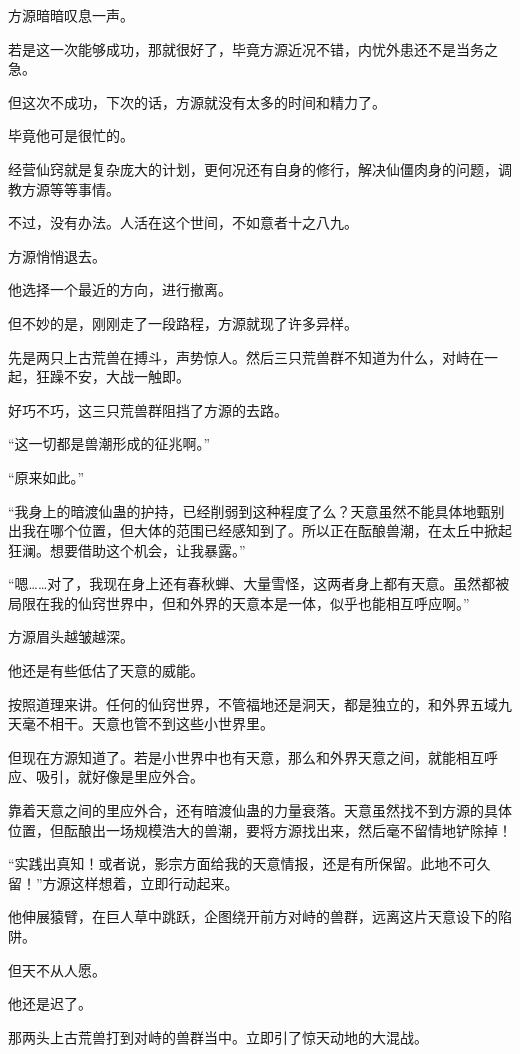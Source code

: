 \begin{this_body}
方源暗暗叹息一声。

若是这一次能够成功，那就很好了，毕竟方源近况不错，内忧外患还不是当务之急。

但这次不成功，下次的话，方源就没有太多的时间和精力了。

毕竟他可是很忙的。

经营仙窍就是复杂庞大的计划，更何况还有自身的修行，解决仙僵肉身的问题，调教方源等等事情。

不过，没有办法。人活在这个世间，不如意者十之八九。

方源悄悄退去。

他选择一个最近的方向，进行撤离。

但不妙的是，刚刚走了一段路程，方源就现了许多异样。

先是两只上古荒兽在搏斗，声势惊人。然后三只荒兽群不知道为什么，对峙在一起，狂躁不安，大战一触即。

好巧不巧，这三只荒兽群阻挡了方源的去路。

“这一切都是兽潮形成的征兆啊。”

“原来如此。”

“我身上的暗渡仙蛊的护持，已经削弱到这种程度了么？天意虽然不能具体地甄别出我在哪个位置，但大体的范围已经感知到了。所以正在酝酿兽潮，在太丘中掀起狂澜。想要借助这个机会，让我暴露。”

“嗯……对了，我现在身上还有春秋蝉、大量雪怪，这两者身上都有天意。虽然都被局限在我的仙窍世界中，但和外界的天意本是一体，似乎也能相互呼应啊。”

方源眉头越皱越深。

他还是有些低估了天意的威能。

按照道理来讲。任何的仙窍世界，不管福地还是洞天，都是独立的，和外界五域九天毫不相干。天意也管不到这些小世界里。

但现在方源知道了。若是小世界中也有天意，那么和外界天意之间，就能相互呼应、吸引，就好像是里应外合。

靠着天意之间的里应外合，还有暗渡仙蛊的力量衰落。天意虽然找不到方源的具体位置，但酝酿出一场规模浩大的兽潮，要将方源找出来，然后毫不留情地铲除掉！

“实践出真知！或者说，影宗方面给我的天意情报，还是有所保留。此地不可久留！”方源这样想着，立即行动起来。

他伸展猿臂，在巨人草中跳跃，企图绕开前方对峙的兽群，远离这片天意设下的陷阱。

但天不从人愿。

他还是迟了。

那两头上古荒兽打到对峙的兽群当中。立即引了惊天动地的大混战。


\end{this_body}
